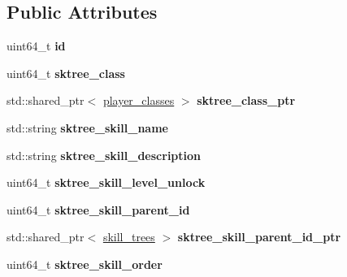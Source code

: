 \subsection*{Public Attributes}
\begin{DoxyCompactItemize}
\item 
\mbox{\label{structmods_1_1orm_1_1skill__trees_a02c6eb17623a3f7f6ca99393703ec0e8}} 
uint64\+\_\+t {\bfseries id}
\item 
\mbox{\label{structmods_1_1orm_1_1skill__trees_a83879b7439e5cac6aa577605935fd316}} 
uint64\+\_\+t {\bfseries sktree\+\_\+class}
\item 
\mbox{\label{structmods_1_1orm_1_1skill__trees_a26e12fcf425a9a553085ee050a797ed1}} 
std\+::shared\+\_\+ptr$<$ \hyperlink{structmods_1_1orm_1_1player__classes}{player\+\_\+classes} $>$ {\bfseries sktree\+\_\+class\+\_\+ptr}
\item 
\mbox{\label{structmods_1_1orm_1_1skill__trees_ac5c627ce18b1ef668f74c63708207fe5}} 
std\+::string {\bfseries sktree\+\_\+skill\+\_\+name}
\item 
\mbox{\label{structmods_1_1orm_1_1skill__trees_ac8c6f7554f005bfb0c47306fb4427f1f}} 
std\+::string {\bfseries sktree\+\_\+skill\+\_\+description}
\item 
\mbox{\label{structmods_1_1orm_1_1skill__trees_a309de61ed7abbf15da746e07126cc0b0}} 
uint64\+\_\+t {\bfseries sktree\+\_\+skill\+\_\+level\+\_\+unlock}
\item 
\mbox{\label{structmods_1_1orm_1_1skill__trees_aa75072200579f300d5dccb7ff6ad969e}} 
uint64\+\_\+t {\bfseries sktree\+\_\+skill\+\_\+parent\+\_\+id}
\item 
\mbox{\label{structmods_1_1orm_1_1skill__trees_a91e3be21d04263bfae865108f107ac52}} 
std\+::shared\+\_\+ptr$<$ \hyperlink{structmods_1_1orm_1_1skill__trees}{skill\+\_\+trees} $>$ {\bfseries sktree\+\_\+skill\+\_\+parent\+\_\+id\+\_\+ptr}
\item 
\mbox{\label{structmods_1_1orm_1_1skill__trees_a621589332288eef662be48b9dc08be85}} 
uint64\+\_\+t {\bfseries sktree\+\_\+skill\+\_\+order}
\end{DoxyCompactItemize}
